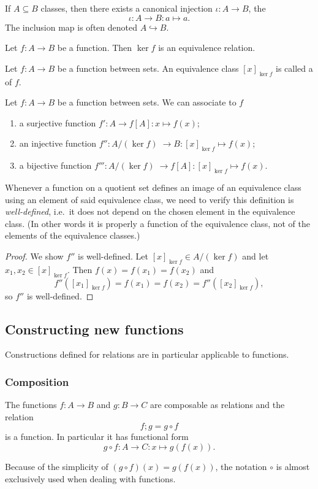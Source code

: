 \begin{lemma}
If $A\subseteq B$ classes, then there exists a canonical injection $\iota: A\to B$, the 
\[ \iota: A\to B: a\mapsto a. \]
The inclusion map is often denoted $A\hookrightarrow B$.
\end{lemma}

\begin{lemma}
Let $f:A\to B$ be a function. Then $\ker f$ is an equivalence relation.
\end{lemma}

\begin{definition}
Let $f: A\to B$ be a function between sets. An equivalence class $[x]_{\ker f}$ is called a  of $f$.
\end{definition}

\begin{proposition}
Let $f:A\to B$ be a function between sets. We can associate to $f$
\begin{enumerate}
\item a surjective function $f': A\to f[A]: x\mapsto f(x)$;
\item an injective function $f'': A/(\ker f) \;\to B: [x]_{\ker f}\mapsto f(x)$;
\item a bijective function $f''': A/(\ker f) \;\to f[A]: [x]_{\ker f}\mapsto f(x)$.
\end{enumerate}
\end{proposition}
Whenever a function on a quotient set defines an image of an equivalence class using an element of said equivalence class, we need to verify this definition is \emph{well-defined}, i.e.\ it does not depend on the chosen element in the equivalence class. (In other words it is properly a function of the equivalence class, not of the elements of the equivalence classes.)
\begin{proof}
We show $f''$ is well-defined. Let $[x]_{\ker f}\in A/(\ker f)$ and let $x_1,x_2\in [x]_{\ker f}$. Then $f(x) = f(x_1) = f(x_2)$ and
\[ f''([x_1]_{\ker f}) = f(x_1) = f(x_2) = f''([x_2]_{\ker f}), \]
so $f''$ is well-defined.
\end{proof}

\subsection{Constructing new functions}
Constructions defined for relations are in particular applicable to functions.

\subsubsection{Composition}
\begin{lemma}
The functions $f:A\to B$ and $g:B\to C$ are composable as relations and the relation
\[ f;g = g\circ f \]
is a function. In particular it has functional form
\[ g\circ f: A\to C: x\mapsto g(f(x)). \]
\end{lemma}
Because of the simplicity of $(g\circ f)(x) = g(f(x))$, the notation $\circ$ is almost exclusively used when dealing with functions.

